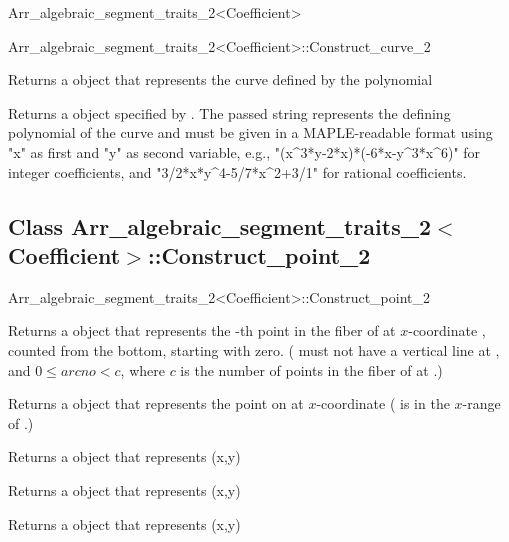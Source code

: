 \begin{ccRefClass}{Arr_algebraic_segment_traits_2<Coefficient>}
\begin{ccClass}{Arr_algebraic_segment_traits_2<Coefficient>::Construct_curve_2}

        {Returns a  object that represents the curve defined by
         the polynomial } 

        {Returns a  object specified by . 
	The passed string represents the defining polynomial of the curve 
	and must be given in a MAPLE-readable format using "x" as first 
	and "y" as second variable, e.g., 
        "(x\^{}3*y-2*x)*(-6*x-y\^{}3*x\^{}6)" 
	for integer coefficients, and "3/2*x*y\^{}4-5/7*x\^{}2+3/1" 
	for rational coefficients.} 


\end{ccClass}

\subsection*{Class 
Arr\_algebraic\_segment\_traits\_2$<$Coefficient$>$::Construct\_point\_2}

\begin{ccClass}{Arr_algebraic_segment_traits_2<Coefficient>::Construct_point_2}


        {Returns a  object that represents the -th
         point in the fiber of  at $x$-coordinate , 
         counted from the bottom, starting with zero.
         \ccPrecond( must not have a vertical line at , 
                    and $0\leq arcno < c$, where $c$ is the number of points 
                     in the fiber of  at .)} 

        {Returns a  object that represents the 
         point on  at $x$-coordinate  
         \ccPrecond( is in the $x$-range of .)}

        {Returns a  object that represents (x,y)} 

        {Returns a  object that represents (x,y)} 

        {Returns a  object that represents (x,y)} 


\end{ccClass}
\end{ccRefClass}
